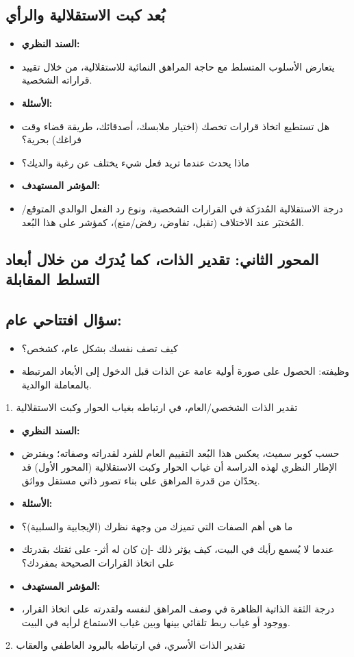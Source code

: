 \documentclass[12pt,oneside]{report}
\begin{document}
\subsection*{بُعد كبت الاستقلالية والرأي}
\begin{itemize}[leftmargin=1.6em,itemsep=1pt]
\item \textbf{السند النظري:}
\item يتعارض الأسلوب المتسلط مع حاجة المراهق النمائية للاستقلالية، من خلال تقييد قراراته الشخصية.
\item \textbf{الأسئلة:}
\item هل تستطيع اتخاذ قرارات تخصك (اختيار ملابسك، أصدقائك، طريقة قضاء وقت فراغك) بحرية؟
\item ماذا يحدث عندما تريد فعل شيء يختلف عن رغبة والديك؟
\item \textbf{المؤشر المستهدف:}
\item درجة الاستقلالية المُدرَكة في القرارات الشخصية، ونوع رد الفعل الوالدي المتوقع/المُختبَر عند الاختلاف (تقبل، تفاوض، رفض/منع)، كمؤشر على هذا البُعد.
\end{itemize}
\subsection*{المحور الثاني: تقدير الذات، كما يُدرَك من خلال أبعاد التسلط المقابلة}
\subsection*{سؤال افتتاحي عام:}
\begin{itemize}[leftmargin=1.6em,itemsep=1pt]
\item كيف تصف نفسك بشكل عام، كشخص؟
\item وظيفته: الحصول على صورة أولية عامة عن الذات قبل الدخول إلى الأبعاد المرتبطة بالمعاملة الوالدية.
\end{itemize}
1. تقدير الذات الشخصي/العام، في ارتباطه بغياب الحوار وكبت الاستقلالية

\begin{itemize}[leftmargin=1.6em,itemsep=1pt]
\item \textbf{السند النظري:}
\item حسب كوبر سميث، يعكس هذا البُعد التقييم العام للفرد لقدراته وصفاته؛ ويفترض الإطار النظري لهذه الدراسة أن غياب الحوار وكبت الاستقلالية (المحور الأول) قد يحدّان من قدرة المراهق على بناء تصور ذاتي مستقل وواثق.
\item \textbf{الأسئلة:}
\item ما هي أهم الصفات التي تميزك من وجهة نظرك (الإيجابية والسلبية)؟
\item عندما لا يُسمع رأيك في البيت، كيف يؤثر ذلك -إن كان له أثر- على ثقتك بقدرتك على اتخاذ القرارات الصحيحة بمفردك؟
\item \textbf{المؤشر المستهدف:}
\item درجة الثقة الذاتية الظاهرة في وصف المراهق لنفسه ولقدرته على اتخاذ القرار، ووجود أو غياب ربط تلقائي بينها وبين غياب الاستماع لرأيه في البيت.
\end{itemize}
2. تقدير الذات الأسري، في ارتباطه بالبرود العاطفي والعقاب
\end{document}
